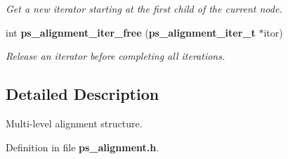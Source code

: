 \begin{DoxyCompactItemize}
\begin{DoxyCompactList}\small\item\em \-Get a new iterator starting at the first child of the current node. \end{DoxyCompactList}\item 
int {\bf ps\-\_\-alignment\-\_\-iter\-\_\-free} ({\bf ps\-\_\-alignment\-\_\-iter\-\_\-t} $\ast$itor)\label{ps__alignment_8h_a80e0020539ea622706bf63883e24d301}

\begin{DoxyCompactList}\small\item\em \-Release an iterator before completing all iterations. \end{DoxyCompactList}\end{DoxyCompactItemize}


\subsection{\-Detailed \-Description}
\-Multi-\/level alignment structure. 

\-Definition in file {\bf ps\-\_\-alignment.\-h}.

